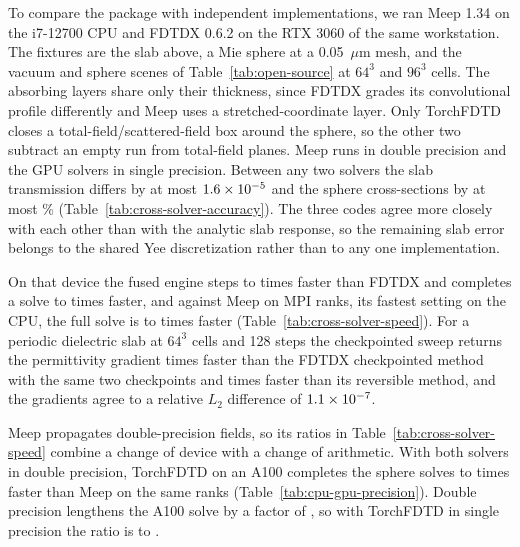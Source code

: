 \documentclass[preprint,11pt]{elsarticle}
\newcommand{\micron}{\ensuremath{\mu\mathrm{m}}}
\begin{document}
To compare the package with independent implementations, we ran Meep 1.34 \citep{oskooi2010} on the i7-12700 CPU and FDTDX 0.6.2 \citep{mahlau2024} on the RTX 3060 of the same workstation. The fixtures are the slab above, a Mie sphere at a 0.05~\micron{} mesh, and the vacuum and sphere scenes of Table~\ref{tab:open-source} at $64^{3}$ and $96^{3}$ cells. The absorbing layers share only their thickness, since FDTDX grades its convolutional profile differently and Meep uses a stretched-coordinate layer. Only TorchFDTD closes a total-field/scattered-field box around the sphere, so the other two subtract an empty run from total-field planes. Meep runs in double precision and the GPU solvers in single precision. Between any two solvers the slab transmission differs by at most $1.6\times10^{-5}$ and the sphere cross-sections by at most \CrossSpherePair\% (Table~\ref{tab:cross-solver-accuracy}). The three codes agree more closely with each other than with the analytic slab response, so the remaining slab error belongs to the shared Yee discretization rather than to any one implementation.

On that device the fused engine steps \CrossFdtdxStepMin{} to \CrossFdtdxStepMax{} times faster than FDTDX and completes a solve \CrossFdtdxFullMin{} to \CrossFdtdxFullMax{} times faster, and against Meep on \CrossMeepRanks{} MPI ranks, its fastest setting on the CPU, the full solve is \CrossMeepFullMin{} to \CrossMeepFullMax{} times faster (Table~\ref{tab:cross-solver-speed}). For a periodic dielectric slab at $64^{3}$ cells and 128 steps the checkpointed sweep returns the permittivity gradient \CrossAdjointCheckpointRatio{} times faster than the FDTDX checkpointed method with the same two checkpoints and \CrossAdjointReversibleRatio{} times faster than its reversible method, and the gradients agree to a relative $L_2$ difference of $1.1\times10^{-7}$.

Meep propagates double-precision fields, so its ratios in Table~\ref{tab:cross-solver-speed} combine a change of device with a change of arithmetic. With both solvers in double precision, TorchFDTD on an A100 completes the sphere solves \PrecisionRatioMin{} to \PrecisionRatioMax{} times faster than Meep on the same \PrecisionMeepRanks{} ranks (Table~\ref{tab:cpu-gpu-precision}). Double precision lengthens the A100 solve by a factor of \PrecisionDoubleCost{}, so with TorchFDTD in single precision the ratio is \PrecisionSingleRatioMin{} to \PrecisionSingleRatioMax{}.




\end{document}

